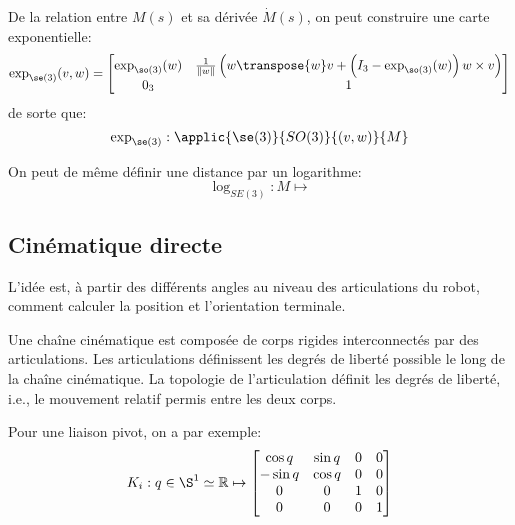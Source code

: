 \documentclass[math]{cours}
\begin{document}
\begin{definition}
	De la relation entre $M(s)$ et sa dérivée $\dot{M}(s)$, on peut construire une carte exponentielle:
	\begin{equation*}
		\exp_{\se(3)}(v, w) = \begin{bmatrix}
			\exp_{\so(3)}(w) & \frac{1}{\norm{w}}\left(w\transpose{w}v + \left(I_{3} - \exp_{\so(3)}(w)\right)w \times v \right) \\
			0_{3}            & 1
		\end{bmatrix}
	\end{equation*}
	de sorte que:
	\begin{equation*}
		\exp_{\se(3)}: \applic{\se(3)}{SO(3)}{(v, w)}{M}
	\end{equation*}
	\label{def:expse3}
\end{definition}

\begin{definition}
	On peut de même définir une distance par un logarithme:
	\begin{equation*}
		\log_{SE(3)}: M \longmapsto
	\end{equation*}
	\label{def:logSE3}
\end{definition}

\subsection{Cinématique directe}
L'idée est, à partir des différents angles au niveau des articulations du robot, comment calculer la position et l'orientation terminale.

\begin{definition}
	Une chaîne cinématique est composée de corps rigides interconnectés par des articulations. Les articulations définissent les degrés de liberté possible le long de la chaîne cinématique.
	La topologie de l'articulation définit les degrés de liberté, i.e., le mouvement relatif permis entre les deux corps.
	\label{def:chainecinematique}
\end{definition}

Pour une liaison pivot, on a par exemple:
	\begin{equation*}
			      K_{i}: q\in \S^{1} \simeq \R \mapsto \begin{bmatrix}
				      \cos q  & \sin q & 0 & 0 \\
				      -\sin q & \cos q & 0 & 0 \\
				      0       & 0      & 1 & 0 \\
				      0       & 0      & 0 & 1
			      \end{bmatrix}
		      \end{equation*}
	\label{def:articulations}
\end{document}
